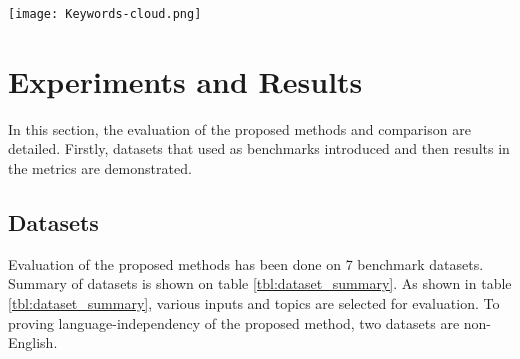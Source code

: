 \documentclass[3p]{elsarticle}
\begin{document}
\begin{tcolorbox}
    \begin{minipage}{\textwidth}
        \centering
        \texttt{[image: Keywords-cloud.png]}
        \label{fig:word-cloud}
    \end{minipage}
\end{tcolorbox}

\section{Experiments and Results}   \label{sec:experiments_results}
In this section, the evaluation of the proposed methods and comparison are detailed. Firstly, datasets that used as benchmarks introduced and then results in the metrics are demonstrated.



















\subsection{Datasets}   \label{subsec:dataset}
Evaluation of the proposed methods has been done on 7 benchmark datasets. Summary of datasets is shown on table \ref{tbl:dataset_summary}. As shown in table \ref{tbl:dataset_summary}, various inputs and topics are selected for evaluation. To proving language-independency of the proposed method, two datasets are non-English.
\end{document}
